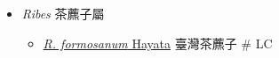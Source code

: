 
  \begin{itemize}
 \item[] \textit{Ribes} 茶藨子屬
                                
  \begin{itemize}
        \item[] \href{http://www.theplantlist.org/tpl1.1/search?q=Ribes+formosanum}{\textit{R. formosanum} Hayata}   臺灣茶藨子  \# LC
  \end{itemize}
  \end{itemize}
